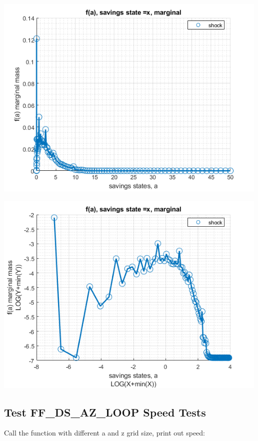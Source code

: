 \documentclass[
]{book}
\begin{document}
\includegraphics[width=5.20833in,height=\textheight]{img/fx_ds_az_loop_images/figure_0.png}

\includegraphics[width=5.20833in,height=\textheight]{img/fx_ds_az_loop_images/figure_1.png}

\hypertarget{test-ff_ds_az_loop-speed-tests}{%
\subsection{Test FF\_DS\_AZ\_LOOP Speed Tests}\label{test-ff_ds_az_loop-speed-tests}}

Call the function with different a and z grid size, print out speed:
\end{document}
